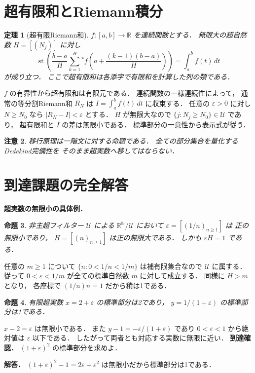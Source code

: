 \documentclass[a5paper,10pt,onecolumn]{jsarticle}
\makeatletter
\theoremstyle{mathnotetheorem}
\newtheorem{theorem}{定理}[section]
\newtheorem{proposition}[theorem]{命題}
\newtheorem{remark}[theorem]{注意}
\renewcommand{\proofname}{証明}
\renewenvironment{proof}[1][\proofname]{%
  \par\pushQED{\qed}\normalfont\topsep4\p@\@plus2\p@\relax
  \trivlist\item[\hskip\labelsep\bfseries #1]\ignorespaces
}{\popQED\endtrivlist\@endpefalse}
\makeatother
\begin{document}
\section{超有限和とRiemann積分}
\begin{theorem}[超有限Riemann和]\label{thm:integral}
$f:[a,b]\to\mathbb R$ を連続関数とする．
無限大の超自然数 $H=[(N_j)]$ に対し
\[
 \operatorname{st}\left(
 \frac{b-a}{H}\sum_{k=1}^H
 {}^*f\left(a+\frac{(k-1)(b-a)}H\right)
 \right)=\int_a^bf(t)\,dt
\]
が成り立つ．
ここで超有限和は各添字で有限和を計算した列の類である．
\end{theorem}
\begin{proof}
$f$ の有界性から超有限和は有限元である．
連続関数の一様連続性によって，
通常の等分割Riemann和 $R_N$ は
$I=\int_a^bf(t)\,dt$ に収束する．
任意の $\varepsilon>0$ に対し
$N\ge N_0$ なら $|R_N-I|<\varepsilon$ とする．
$H$ が無限大なので
$\{j:N_j\ge N_0\}\in\mathcal U$ であり，
超有限和と $I$ の差は無限小である．
標準部分の一意性から表示式が従う．
\end{proof}
\begin{remark}
移行原理は一階文に対する命題である．
全ての部分集合を量化するDedekind完備性を
そのまま超実数へ移してはならない．
\end{remark}

\section{到達課題の完全解答}
\noindent\textbf{超実数の無限小の具体例．}
\begin{proposition}
非主超フィルター $\mathcal U$ による
$\mathbb R^{\mathbb N}/\mathcal U$ において
$\varepsilon=[(1/n)_{n\ge1}]$ は
正の無限小であり，
$H=[(n)_{n\ge1}]$ は正の無限大である．
しかも $\varepsilon H=1$ である．
\end{proposition}
\begin{proof}
任意の $m\ge1$ について
$\{n:0<1/n<1/m\}$ は補有限集合なので
$\mathcal U$ に属する．従って
$0<\varepsilon<1/m$ が全ての標準自然数 $m$
に対して成立する．
同様に $H>m$ となり，
各座標で $(1/n)n=1$ だから積は1である．
\end{proof}
\begin{proposition}
有限超実数 $x=2+\varepsilon$ の標準部分は2であり，
$y=1/(1+\varepsilon)$ の標準部分は1である．
\end{proposition}
\begin{proof}
$x-2=\varepsilon$ は無限小である．
また $y-1=-\varepsilon/(1+\varepsilon)$ であり
$0<\varepsilon<1$ から絶対値は $\varepsilon$ 以下である．
したがって両者とも対応する実数に無限に近い．
\end{proof}
\noindent\textbf{到達確認．}
$(1+\varepsilon)^2$ の標準部分を求めよ．
\par\noindent\textbf{解答．}
$(1+\varepsilon)^2-1=2\varepsilon+\varepsilon^2$
は無限小だから標準部分は1である．
\end{document}
